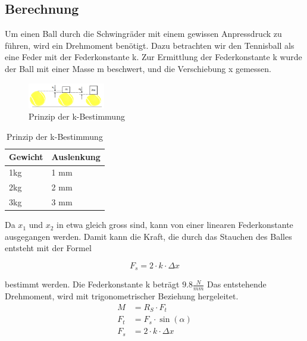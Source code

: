 \subsection{Berechnung}
Um einen Ball durch die Schwingräder mit einem gewissen Anpressdruck zu führen, wird ein Drehmoment benötigt. Dazu betrachten wir den Tennisball als eine Feder mit der Federkonstante k.
Zur Ermittlung der Federkonstante k wurde der Ball mit einer Masse m beschwert, und die Verschiebung x gemessen.

\begin{figure}[h!]
	\centering
	\includegraphics[width=0.3\textwidth]{Enddokumentation/Anhang/Bilder/KompressionBaelle.png}
	\caption{Prinzip der k-Bestimmung}
	\label{fig:BallKomp}
\end{figure}

\begin{table}[h!]
	\begin{tabular}{p{1.5cm}p{1.7cm}}
		Gewicht & Auslenkung\\
		\hline
		1kg & 1 mm\\
		2kg & 2 mm\\
		3kg & 3 mm\\
	\end{tabular}
	\centering
	\caption{Prinzip der k-Bestimmung}
	\label{tab:BallKompErgebnis}
\end{table}

Da $x_1$ und $x_2$ in etwa gleich gross sind, kann von einer linearen Federkonstante ausgegangen werden. Damit kann die Kraft, die durch das Stauchen des Balles entsteht mit der Formel

\begin{equation}  
    F_s=2\cdot k \cdot \Delta x 
\end{equation}

bestimmt werden. Die Federkonstante k beträgt $9.8\frac{N}{mm}$ Das entstehende Drehmoment, wird mit trigonometrischer Beziehung hergeleitet.
\begin{align}  
    \label{equ:Formel_M} %
    M &= R_S \cdot F_t\\
    F_t &= F_s \cdot \sin(\alpha)\\ 
    F_s &= 2\cdot k \cdot \Delta x 
\end{align}

